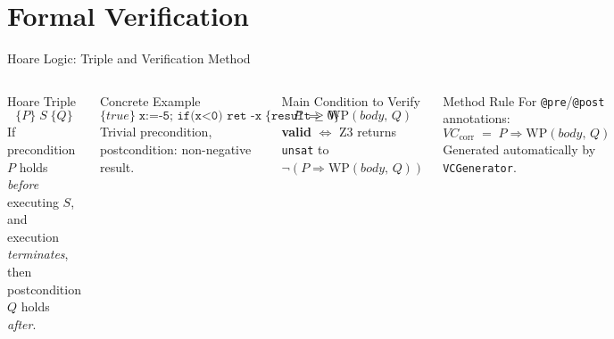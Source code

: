 \documentclass[aspectratio=169,11pt]{beamer}
\newcommand{\WP}[2]{\mathrm{WP}(#1,\,#2)}
\newcommand{\hoare}[3]{\{#1\}\;#2\;\{#3\}}
\begin{document}
\section{Formal Verification}

\begin{frame}{Hoare Logic: Triple and Verification Method}
\begin{columns}[c]
  \begin{block}{Hoare Triple}
    \bigskip
    \[ \hoare{P}{S}{Q} \]
    \bigskip
    \normalsize
    If precondition $P$ holds \emph{before} executing $S$,
    and execution \emph{terminates}, then postcondition $Q$
    holds \emph{after}.
    \bigskip
  \end{block}
  \begin{exampleblock}{Concrete Example}
    \[ \hoare{\mathit{true}}{\texttt{x:=-5; if(x<0) ret -x}}{\texttt{result} \geq 0} \]
    \small Trivial precondition, postcondition: non-negative result.
  \end{exampleblock}

  \begin{alertblock}{Main Condition to Verify}
    \bigskip
    \[ P \;\Rightarrow\; \WP{\mathit{body}}{Q} \]
    \bigskip
    \small
    \textbf{valid} $\iff$ Z3 returns \texttt{unsat} to $\neg(P \Rightarrow \WP{\mathit{body}}{Q})$
    \bigskip
  \end{alertblock}
  \begin{block}{Method Rule}
    \bigskip
    For \texttt{@pre}/\texttt{@post} annotations:
    \[ \mathit{VC}_{\mathrm{corr}} \;=\; P \Rightarrow \WP{\mathit{body}}{Q} \]
    \small Generated automatically by \texttt{VCGenerator}.
    \bigskip
  \end{block}
\end{columns}
\end{frame}
\end{document}
